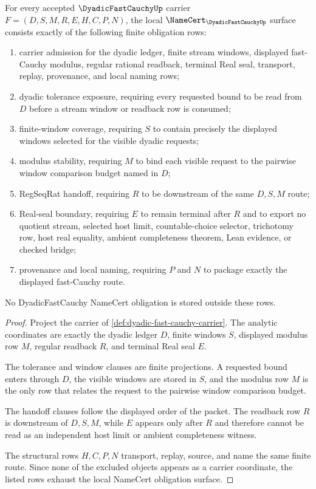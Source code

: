 \begin{theorem}\label{thm:dyadic-fast-cauchy-namecert-obligations}
For every accepted $\DyadicFastCauchyUp$ carrier $F=(D,S,M,R,E,H,C,P,N)$, the local $\NameCert_{\DyadicFastCauchyUp}$ surface consists exactly of the following finite obligation rows:
\begin{enumerate}
\item carrier admission for the dyadic ledger, finite stream windows, displayed fast-Cauchy modulus, regular rational readback, terminal Real seal, transport, replay, provenance, and local naming rows;
\item dyadic tolerance exposure, requiring every requested bound to be read from $D$ before a stream window or readback row is consumed;
\item finite-window coverage, requiring $S$ to contain precisely the displayed windows selected for the visible dyadic requests;
\item modulus stability, requiring $M$ to bind each visible request to the pairwise window comparison budget named in $D$;
\item RegSeqRat handoff, requiring $R$ to be downstream of the same $D,S,M$ route;
\item Real-seal boundary, requiring $E$ to remain terminal after $R$ and to export no quotient stream, selected host limit, countable-choice selector, trichotomy row, host real equality, ambient completeness theorem, Lean evidence, or checked bridge;
\item provenance and local naming, requiring $P$ and $N$ to package exactly the displayed fast-Cauchy route.
\end{enumerate}
No DyadicFastCauchy NameCert obligation is stored outside these rows.
\end{theorem}
\begin{proof}
Project the carrier of \autoref{def:dyadic-fast-cauchy-carrier}. The analytic coordinates are exactly the dyadic ledger $D$, finite windows $S$, displayed modulus row $M$, regular readback $R$, and terminal Real seal $E$.

The tolerance and window clauses are finite projections. A requested bound enters through $D$, the visible windows are stored in $S$, and the modulus row $M$ is the only row that relates the request to the pairwise window comparison budget.

The handoff clauses follow the displayed order of the packet. The readback row $R$ is downstream of $D,S,M$, while $E$ appears only after $R$ and therefore cannot be read as an independent host limit or ambient completeness witness.

The structural rows $H,C,P,N$ transport, replay, source, and name the same finite route. Since none of the excluded objects appears as a carrier coordinate, the listed rows exhaust the local NameCert obligation surface.
\end{proof}

